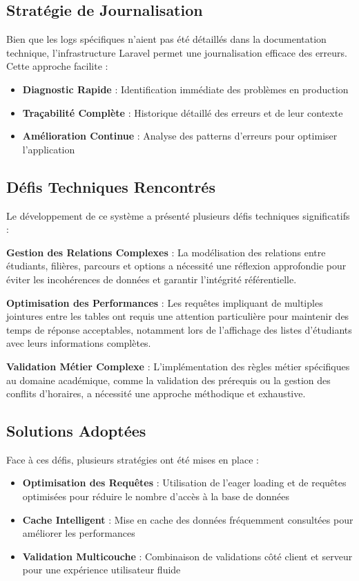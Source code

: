 \documentclass[12pt,a4paper]{report}
\begin{document}
\subsection{Stratégie de Journalisation}

Bien que les logs spécifiques n'aient pas été détaillés dans la documentation technique, l'infrastructure Laravel permet une journalisation efficace des erreurs. Cette approche facilite :

\begin{itemize}
\item \textbf{Diagnostic Rapide} : Identification immédiate des problèmes en production
\item \textbf{Traçabilité Complète} : Historique détaillé des erreurs et de leur contexte
\item \textbf{Amélioration Continue} : Analyse des patterns d'erreurs pour optimiser l'application
\end{itemize}

\subsection{Défis Techniques Rencontrés}

Le développement de ce système a présenté plusieurs défis techniques significatifs :

\textbf{Gestion des Relations Complexes} : La modélisation des relations entre étudiants, filières, parcours et options a nécessité une réflexion approfondie pour éviter les incohérences de données et garantir l'intégrité référentielle.

\textbf{Optimisation des Performances} : Les requêtes impliquant de multiples jointures entre les tables ont requis une attention particulière pour maintenir des temps de réponse acceptables, notamment lors de l'affichage des listes d'étudiants avec leurs informations complètes.

\textbf{Validation Métier Complexe} : L'implémentation des règles métier spécifiques au domaine académique, comme la validation des prérequis ou la gestion des conflits d'horaires, a nécessité une approche méthodique et exhaustive.

\subsection{Solutions Adoptées}

Face à ces défis, plusieurs stratégies ont été mises en place :

\begin{itemize}
\item \textbf{Optimisation des Requêtes} : Utilisation de l'eager loading et de requêtes optimisées pour réduire le nombre d'accès à la base de données
\item \textbf{Cache Intelligent} : Mise en cache des données fréquemment consultées pour améliorer les performances
\item \textbf{Validation Multicouche} : Combinaison de validations côté client et serveur pour une expérience utilisateur fluide
\end{itemize}
\end{document}
